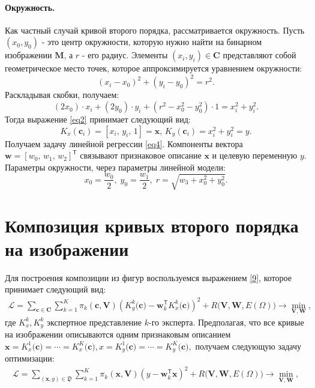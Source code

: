 \paragraph{Окружность.} Как частный случай кривой второго порядка, рассматривается окружность.
Пусть $(x_0, y_0)$ - это центр окружности, которую нужно найти на бинарном изображении $\mathbf{M}$, а $r$ - его радиус.
Элементы $(x_i, y_i)\in\mathbf{C}$ представляют собой геометрическое место точек, которое аппроксимируется уравнением окружности:
\[
(x_i - x_0)^2 + (y_i - y_0)^2 = r^2.
\]
Раскладывая скобки, получаем:
\[(2x_0)\cdot x_i + (2y_0)\cdot y_i + (r^2 - x_0^2 - y_0^2)\cdot 1 = x_i^2 + y_i^2 . 
\]
Тогда выражение \eqref{eq2} принимает следующий вид:
\[
\label{10}
K_{x}(\mathbf{c}_i) = [x_i, \, y_i, \, 1] = \mathbf{x}, \,  K_{y}(\mathbf{c}_i) = x_i^2+y_i^2 = y.
\] 
Получаем задачу линейной регрессии \eqref{eq4}.
Компоненты вектора $\mathbf{w} = [w_0, \, w_1, \, w_2]^\mathsf{T}$ связывают признаковое описание $\mathbf{x}$ и целевую переменную $y$. Параметры окружности, через параметры линейной модели: \[ x_0 = \frac{w_0}{2}, \; y_0 = \frac{w_1}{2}, \; r = \sqrt{w_3 + x_0^2 + y_0 ^2}.\]

\section{Композиция кривых второго порядка на изображении}
\label{sec:4}
Для построения композиции из фигур воспользуемся выражением \eqref{9}, которое принимает следующий вид:
\[ 
\label{statment:optim:task}
\begin{aligned}
\mathcal{L} = \sum\limits_{\mathbf{c} \in \mathbf{C}} \sum\limits_{k = 1}^{K} \pi_k(\mathbf{c}, \mathbf{V})\left(K^{k}_y\bigr(\mathbf{c}\bigr) - \mathbf{w}_k^{\mathsf{T}}K^{k}_x\bigr(\mathbf{c}\bigr)\right)^2 + R\bigl(\mathbf{V}, \mathbf{W}, E(\Omega)\bigr) \rightarrow \min_{\mathbf{V}, \mathbf{W}},
\end{aligned}
\] 
где $K^{k}_x, K^{k}_y$ экспертное представление $k$-го эксперта. Предполагая, что все кривые на изображении описываются одним признаковым описанием $\mathbf{x} =K^{1}_x\bigr(\mathbf{c}\bigr)=\cdots=K^{K}_x\bigr(\mathbf{c}\bigr), x= K^{1}_y\bigr(\mathbf{c}\bigr)=\cdots=K^{K}_y\bigr(\mathbf{c}\bigr),$ получаем следующую задачу оптимизации:
\[ 
\label{statment:optim:task:simp}
\begin{aligned}
\mathcal{L} = \sum\limits_{\left(\mathbf{x}, y\right) \in \mathfrak{D}} \sum\limits_{k = 1}^{K} \pi_k(\mathbf{x}, \mathbf{V})\left(y - \mathbf{w}_k^{\mathsf{T}}\mathbf{x}\right)^2 + R\bigl(\mathbf{V}, \mathbf{W}, E(\Omega)\bigr) \rightarrow \min_{\mathbf{V}, \mathbf{W}},
\end{aligned}
\] 

